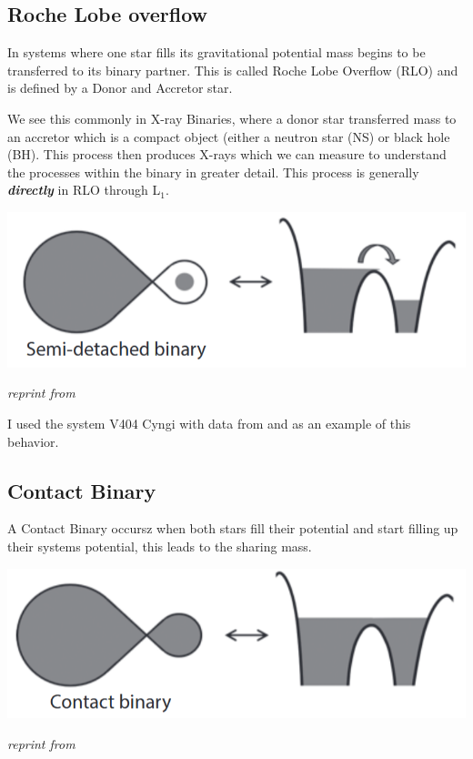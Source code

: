 \documentclass[12pt, letterpaper]{article}
\begin{document}
        \subsection{\centering Roche Lobe overflow} %
        In systems where one star fills its gravitational potential mass begins to be transferred to its binary partner. This is called Roche Lobe Overflow (RLO) and is defined by a Donor and Accretor star. 

        We see this commonly in X-ray Binaries, where a donor star transferred mass to an accretor which is a compact object (either a neutron star (NS) or black hole (BH). This process then produces X-rays which we can measure to understand the processes within the binary in greater detail. This process is generally \textbf{\textit{directly}} in RLO through L$_1$. 
        
       \begin{center}
            \includegraphics[scale = .4]{Figs/Semi-detached binary.png}

            \textit{reprint from \cite{TaurisvandenHeuvel+2023}}
        \end{center}
        
        I used the system V404 Cyngi with data from \cite{Bernardini_2016} and \cite{10.1093/mnras/271.1.L10} as an example of this behavior. 

        \subsection{\centering Contact Binary}
        A Contact Binary occursz when both stars fill their potential and start filling up their systems potential, this leads to the sharing mass.
        
        \begin{center}
        \includegraphics[scale = .4]{Figs/Conact Binary.png}

        \textit{reprint from \cite{TaurisvandenHeuvel+2023}}
        \end{center}
\end{document}
